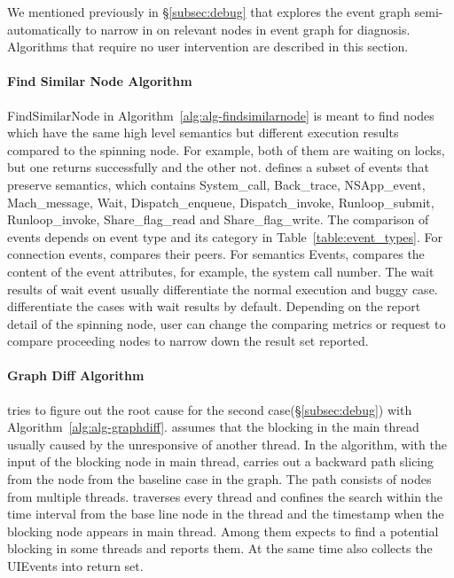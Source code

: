 We mentioned previously in \S\ref{subsec:debug} that \xxx explores the event
graph semi-automatically to narrow in on relevant nodes in event graph for
diagnosis. Algorithms that require no user intervention are described
in this section.

\paragraph{Find Similar Node Algorithm}

FindSimilarNode in Algorithm~\ref{alg:alg-findsimilarnode} is meant to find
nodes which have the same high level semantics but different execution results
compared to the spinning node. For example, both of them are waiting on locks,
but one returns successfully and the other not. \xxx defines a subset of events
that preserve semantics, which contains System\_call, Back\_trace, NSApp\_event,
Mach\_message, Wait, Dispatch\_enqueue, Dispatch\_invoke, Runloop\_submit,
Runloop\_invoke, Share\_flag\_read and Share\_flag\_write. The comparison of
events depends on event type and its category in Table~\ref{table:event_types}.
For connection events, \xxx compares their peers. For semantics Events, \xxx
compares the content of the event attributes, for example, the system call
number. The wait results of wait event usually differentiate the normal
execution and buggy case. \xxx differentiate the cases with wait results by
default. Depending on the report detail of the spinning node, user can change
the comparing metrics or request \xxx to compare proceeding nodes to narrow down
the result set reported.

\paragraph{Graph Diff Algorithm}

\xxx tries to figure out the root cause for the second
case(\S\ref{subsec:debug}) with Algorithm~\ref{alg:alg-graphdiff}. \xxx assumes
that the blocking in the main thread usually caused by the unresponsive of
another thread. In the algorithm, with the input of the blocking node in main
thread, \xxx carries out a backward path slicing from the node from the baseline
case in the graph. The path consists of nodes from multiple threads. \xxx
traverses every thread and confines the search within the time interval from the
base line node in the thread and the timestamp when the blocking node appears
in main thread. Among them \xxx expects to find a potential blocking in some
threads and reports them. At the same time \xxx also collects the UIEvents into
return set.

